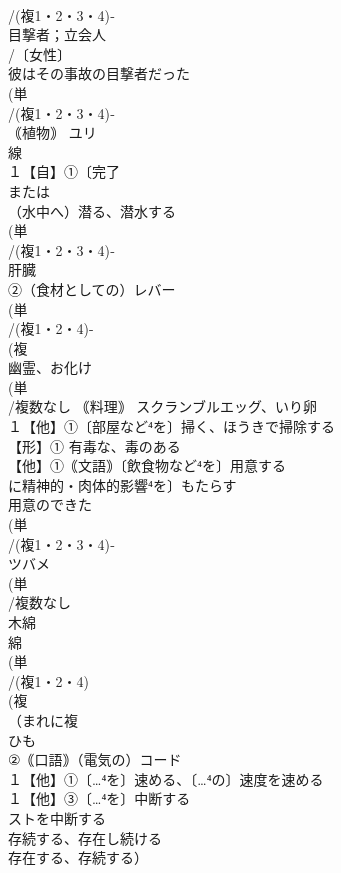 \documentclass[8pt]{extreport}
\begin{document}
\begin{CJK}{UTF8}{min}
\\	/(複1・2・3・4)‐
\\	目撃者；立会人
\\	/〔女性〕
\\	彼はその事故の目撃者だった
\\	(単
\\	/(複1・2・3・4)‐
\\	｟植物｠ ユリ 
\\	線
\\	１【自】①〔完了
\\	または
\\	（水中へ）潜る、潜水する 
\\	(単
\\	/(複1・2・3・4)‐
\\	肝臓 
\\	②（食材としての）レバー 
\\	(単
\\	/(複1・2・4)-
\\	(複
\\	幽霊、お化け 
\\	(単
\\	/複数なし ｟料理｠ スクランブルエッグ、いり卵 
\\	１【他】①〔部屋など⁴を〕掃く、ほうきで掃除する 
\\	【形】① 有毒な、毒のある 
\\	【他】①｟文語｠〔飲食物など⁴を〕用意する　
\\	に精神的・肉体的影響⁴を〕もたらす 
\\	用意のできた
\\	(単
\\	/(複1・2・3・4)‐
\\	ツバメ 
\\	(単
\\	/複数なし 
\\	木綿 
\\	綿 
\\	(単
\\	/(複1・2・4)
\\	(複
\\	（まれに複
\\	ひも 
\\	②｟口語｠（電気の）コード 
\\	１【他】①〔…⁴を〕速める、〔…⁴の〕速度を速める
\\	１【他】③〔…⁴を〕中断する 
\\	ストを中断する 
\\	存続する、存在し続ける 
\\	存在する、存続する）

\end{CJK}
\end{document}
